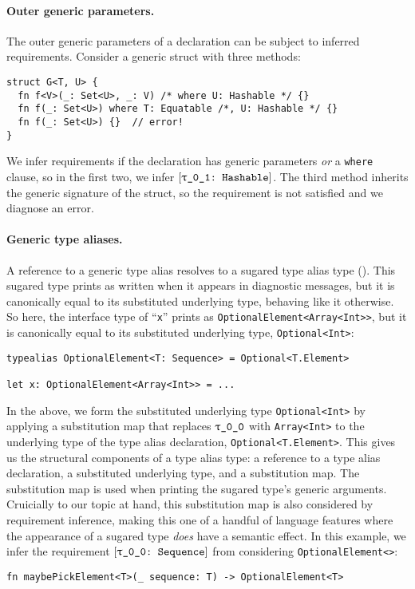 \documentclass[../generics]{subfiles}
\begin{document}
\paragraph{Outer generic parameters.}
The outer generic parameters of a declaration can be subject to inferred requirements. Consider a generic struct with three methods:
\begin{Verbatim}
struct G<T, U> {
  fn f<V>(_: Set<U>, _: V) /* where U: Hashable */ {}
  fn f(_: Set<U>) where T: Equatable /*, U: Hashable */ {}
  fn f(_: Set<U>) {}  // error!
}
\end{Verbatim}
We infer requirements if the declaration has generic parameters \emph{or} a \texttt{where} clause, so in the first two, we infer $\ConfReq{\rU}{Hashable}$. The third method inherits the generic signature of the struct, so the requirement is not satisfied and we diagnose an error.

\paragraph{Generic type aliases.}
A reference to a generic type alias resolves to a sugared type alias type (). This sugared type prints as written when it appears in diagnostic messages, but it is canonically equal to its substituted underlying type, behaving like it otherwise. So here, the interface type of ``\texttt{x}'' prints as \texttt{OptionalElement<Array<Int>>}, but it is canonically equal to its substituted underlying type, \texttt{Optional<Int>}:
\begin{Verbatim}
typealias OptionalElement<T: Sequence> = Optional<T.Element>

let x: OptionalElement<Array<Int>> = ...
\end{Verbatim}

In the above, we form the substituted underlying type \texttt{Optional<Int>} by applying a substitution map that replaces $\rT$ with \texttt{Array<Int>} to the underlying type of the type alias declaration, \texttt{Optional<T.Element>}. This gives us the structural components of a type alias type: a reference to a type alias declaration, a substituted underlying type, and a substitution map. The substitution map is used when printing the sugared type's generic arguments. Cruicially to our topic at hand, this substitution map is also considered by requirement inference, making this one of a handful of language features where the appearance of a sugared type \emph{does} have a semantic effect. In this example, we infer the requirement $\rTSequence$ from considering \texttt{OptionalElement<\rT>}:
\begin{Verbatim}
fn maybePickElement<T>(_ sequence: T) -> OptionalElement<T>
\end{Verbatim}
\end{document}
